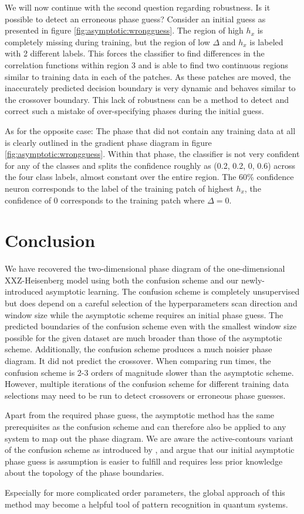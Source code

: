 \documentclass[prl, reprint, twocolumn]{revtex4-1}
\begin{document}
	We will now continue with the second question regarding robustness. Is it possible to detect an erroneous phase guess? Consider an initial guess as presented in figure \ref{fig:asymptotic:wrongguess}. The region of high $h_x$ is completely missing during training, but the region of low $\Delta$ and $h_x$ is labeled with 2 different labels. This forces the classifier to find differences in the correlation functions within region 3 and is able to find two continuous regions similar to training data in each of the patches. As these patches are moved, the inaccurately predicted decision boundary is very dynamic and behaves similar to the crossover boundary. This lack of robustness can be a method to detect and correct such a mistake of over-specifying phases during the initial guess. 
	
	As for the opposite case: The phase that did not contain any training data at all is clearly outlined in the gradient phase diagram in figure \ref{fig:asymptotic:wrongguess}. Within that phase, the classifier is not very confident for any of the classes and splits the confidence roughly as (0.2, 0.2, 0, 0.6) across the four class labels, almost constant over the entire region. The 60\% confidence neuron corresponds to the label of the training patch of highest $h_x$, the confidence of 0 corresponds to the training patch where $\Delta=0$.
	
	
	
	\section{Conclusion}
	We have recovered the two-dimensional phase diagram of the one-dimensional XXZ-Heisenberg model using both the confusion scheme and our newly-introduced asymptotic learning. The confusion scheme is completely unsupervised but does depend on a careful selection of the hyperparameters scan direction and window size while the asymptotic scheme requires an initial phase guess. The predicted boundaries of the confusion scheme even with the smallest window size possible for the given dataset are much broader than those of the asymptotic scheme. Additionally, the confusion scheme produces a much noisier phase diagram. It did not predict the crossover. When comparing run times, the confusion scheme is 2-3 orders of magnitude slower than the asymptotic scheme. However, multiple iterations of the confusion scheme for different training data selections may need to be run to detect crossovers or erroneous phase guesses.
	
	Apart from the required phase guess, the asymptotic method has the same prerequisites as the confusion scheme and can therefore also be applied to any system to map out the phase diagram. We are aware the active-contours variant of the confusion scheme as introduced by \cite{Liu2017}, and argue that our initial asymptotic phase guess is assumption is easier to fulfill and requires less prior knowledge about the topology of the phase boundaries.
	
	Especially for more complicated order parameters, the global approach of this method may become a helpful tool of pattern recognition in quantum systems.
	
	
	
	
	
\end{document}
